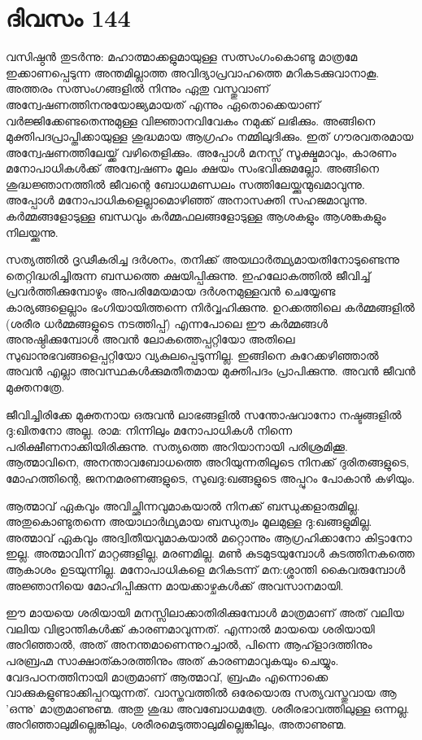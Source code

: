 \newpage
\section{ദിവസം 144}


വസിഷ്ഠൻ തുടർന്നു: മഹാത്മാക്കളുമായുള്ള സത്സംഗംകൊണ്ടു മാത്രമേ ഇക്കാണപ്പെടുന്ന അന്തമില്ലാത്ത അവിദ്യാപ്രവാഹത്തെ  മറികടക്കുവാനാകൂ. അത്തരം സത്സംഗങ്ങളിൽ നിന്നും ഏതു വസ്തുവാണ്‌ അന്വേഷണത്തിനനുയോജ്യമായത് എന്നും ഏതൊക്കെയാണ്‌ വർജ്ജിക്കേണ്ടതെന്നുമുള്ള വിജ്ഞാനവിവേകം നമുക്ക് ലഭിക്കും. അങ്ങിനെ മുക്തിപദപ്രാപ്തിക്കായുള്ള ശുദ്ധമായ ആഗ്രഹം നമ്മിലുദിക്കും. ഇത് ഗൗരവതരമായ അന്വേഷണത്തിലേയ്ക്ക് വഴിതെളിക്കും. അപ്പോൾ മനസ്സ് സൂക്ഷ്മമാവും, കാരണം മനോപാധികൾക്ക് അന്വേഷണം മൂലം ക്ഷയം സംഭവിക്കുമല്ലോ. അങ്ങിനെ ശുദ്ധജ്ഞാനത്തിൽ ജീവന്റെ ബോധമണ്ഡലം സത്തിലേയ്ക്കുന്മുഖമാവുന്നു. അപ്പോൾ മനോപാധികളെല്ലാമൊഴിഞ്ഞ് അനാസക്തി സഹജമാവുന്നു. കർമ്മങ്ങളോടുള്ള ബന്ധവും കർമ്മഫലങ്ങളോടുള്ള ആശകളും ആശങ്കകളും നിലയ്ക്കുന്നു.

സത്യത്തിൽ ദൃഢീകരിച്ച ദർശനം, തനിക്ക് അയഥാർത്ഥ്യമായതിനോടുണ്ടെന്നു തെറ്റിദ്ധരിച്ചിരുന്ന ബന്ധത്തെ ക്ഷയിപ്പിക്കുന്നു. ഇഹലോകത്തിൽ ജീവിച്ച് പ്രവർത്തിക്കുമ്പോഴും അപരിമേയമായ ദർശനമുള്ളവൻ ചെയ്യേണ്ട കാര്യങ്ങളെല്ലാം ഭംഗിയായിത്തന്നെ നിർവ്വഹിക്കുന്നു. ഉറക്കത്തിലെ കർമ്മങ്ങളിൽ (ശരീര ധർമ്മങ്ങളുടെ നടത്തിപ്പ്) എന്നപോലെ ഈ കർമ്മങ്ങൾ അനുഷ്ഠിക്കുമ്പോൾ അവൻ ലോകത്തെപ്പറ്റിയോ അതിലെ സുഖാനുഭവങ്ങളെപ്പറ്റിയോ വ്യകുലപ്പെടുന്നില്ല. ഇങ്ങിനെ കുറേക്കഴിഞ്ഞാൽ അവൻ എല്ലാ അവസ്ഥകൾക്കുമതീതമായ മുക്തിപദം പ്രാപിക്കുന്നു. അവൻ ജീവൻ മുക്തനത്രേ.

ജീവിച്ചിരിക്കേ മുക്തനായ ഒരുവൻ ലാഭങ്ങളിൽ സന്തോഷവാനോ നഷ്ടങ്ങളിൽ ദു:ഖിതനോ അല്ല. രാമ: നിന്നിലും മനോപാധികൾ നിന്നെ പരിക്ഷീണനാക്കിയിരിക്കുന്നു. സത്യത്തെ അറിയാനായി പരിശ്രമിക്കൂ. ആത്മാവിനെ, അനന്താവബോധത്തെ അറിയുന്നതിലൂടെ നിനക്ക് ദുരിതങ്ങളുടെ, മോഹത്തിന്റെ, ജനനമരണങ്ങളുടെ, സുഖദു:ഖങ്ങളുടെ അപ്പുറം പോകാൻ കഴിയും.

ആത്മാവ് ഏകവും അവിച്ഛിന്നവുമാകയാൽ നിനക്ക് ബന്ധുക്കളാരുമില്ല. അതുകൊണ്ടുതന്നെ അയാഥാർഥ്യമായ ബന്ധുത്വം മൂലമുള്ള ദു:ഖങ്ങളുമില്ല. അത്മാവ് ഏകവും അദ്വിതീയവുമാകയാൽ മറ്റൊന്നും ആഗ്രഹിക്കാനോ കിട്ടാനോ ഇല്ല. അത്മാവിന്‌ മാറ്റങ്ങളില്ല, മരണമില്ല. മൺ കുടമുടയുമ്പോൾ കുടത്തിനകത്തെ ആകാശം ഉടയുന്നില്ല. മനോപാധികളെ മറികടന്ന്‌ മന:ശ്ശാന്തി കൈവരുമ്പോൾ അജ്ഞാനിയെ മോഹിപ്പിക്കുന്ന മായക്കാഴ്ചകൾക്ക് അവസാനമായി.

ഈ മായയെ ശരിയായി മനസ്സിലാക്കാതിരിക്കുമ്പോൾ മാത്രമാണ്‌ അത് വലിയ വലിയ വിഭ്രാന്തികൾക്ക് കാരണമാവുന്നത്. എന്നാൽ മായയെ ശരിയായി അറിഞ്ഞാൽ, അത് അനന്തമാണെന്നുറച്ചാൽ, പിന്നെ ആഹ്ളാദത്തിനും പരബ്രഹ്മ സാക്ഷാത്കാരത്തിനും അത് കാരണമാവുകയും ചെയ്യും. വേദപഠനത്തിനായി മാത്രമാണ്‌ ആത്മാവ്, ബ്രഹ്മം എന്നൊക്കെ വാക്കുകളുണ്ടാക്കിപ്പറയുന്നത്. വാസ്തവത്തിൽ ഒരേയൊരു സത്യവസ്തുവായ ആ 'ഒന്നു' മാത്രമാണുണ്മ. അതു ശുദ്ധ അവബോധമത്രേ. ശരീരഭാവത്തിലുള്ള ഒന്നല്ല. അറിഞ്ഞാലുമില്ലെങ്കിലും, ശരീരമെടുത്താലുമില്ലെങ്കിലും, അതാണുണ്മ.

